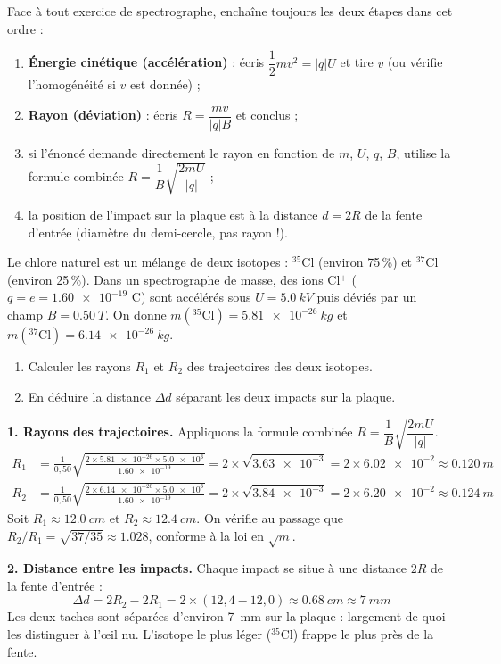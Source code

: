 \documentclass[11pt]{article}
\begin{document}
\begin{methode}
Face à tout exercice de spectrographe, enchaîne toujours les deux étapes dans cet ordre :
\begin{enumerate}
\item \textbf{Énergie cinétique (accélération)} : écris $\dfrac{1}{2}mv^2 = |q|U$ et tire $v$ (ou vérifie l'homogénéité si $v$ est donnée) ;
\item \textbf{Rayon (déviation)} : écris $R = \dfrac{mv}{|q|B}$ et conclus ;
\item si l'énoncé demande directement le rayon en fonction de $m$, $U$, $q$, $B$, utilise la formule combinée $R = \dfrac{1}{B}\sqrt{\dfrac{2mU}{|q|}}$ ;
\item la position de l'impact sur la plaque est à la distance $d = 2R$ de la fente d'entrée (diamètre du demi-cercle, pas rayon !).
\end{enumerate}
\end{methode}

\begin{exoresolu}
Le chlore naturel est un mélange de deux isotopes : $^{35}$Cl (environ 75\,\%) et $^{37}$Cl (environ 25\,\%). Dans un spectrographe de masse, des ions Cl$^+$ ($q = e = \num{1,60e-19}$ C) sont accélérés sous $U = \SI{5,0}{kV}$ puis déviés par un champ $B = \SI{0,50}{T}$. On donne $m(^{35}\text{Cl}) = \SI{5,81e-26}{kg}$ et $m(^{37}\text{Cl}) = \SI{6,14e-26}{kg}$.
\begin{enumerate}
\item Calculer les rayons $R_1$ et $R_2$ des trajectoires des deux isotopes.
\item En déduire la distance $\Delta d$ séparant les deux impacts sur la plaque.
\end{enumerate}
\tcblower
\textbf{1. Rayons des trajectoires.} Appliquons la formule combinée $R = \dfrac{1}{B}\sqrt{\dfrac{2mU}{|q|}}$.
\begin{align*}
R_1 &= \frac{1}{0{,}50}\sqrt{\frac{2\times \num{5,81e-26}\times \num{5,0e3}}{\num{1,60e-19}}}
= 2\times\sqrt{\num{3,63e-3}} = 2\times \num{6,02e-2} \approx \SI{0,120}{m} \\[4pt]
R_2 &= \frac{1}{0{,}50}\sqrt{\frac{2\times \num{6,14e-26}\times \num{5,0e3}}{\num{1,60e-19}}}
= 2\times\sqrt{\num{3,84e-3}} = 2\times \num{6,20e-2} \approx \SI{0,124}{m}
\end{align*}
Soit $R_1 \approx \SI{12,0}{cm}$ et $R_2 \approx \SI{12,4}{cm}$. On vérifie au passage que $R_2/R_1 = \sqrt{37/35} \approx \num{1,028}$, conforme à la loi en $\sqrt{m}$.

\textbf{2. Distance entre les impacts.} Chaque impact se situe à une distance $2R$ de la fente d'entrée :
\[ \Delta d = 2R_2 - 2R_1 = 2\times(12{,}4 - 12{,}0) \approx \SI{0,68}{cm} \approx \SI{7}{mm} \]
Les deux taches sont séparées d'environ \SI{7}{mm} sur la plaque : largement de quoi les distinguer à l'œil nu. L'isotope le plus léger ($^{35}$Cl) frappe le plus près de la fente.
\end{exoresolu}
\end{document}
